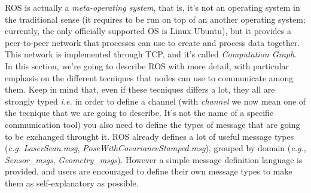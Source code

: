 \ac{ROS} is actually a \textit{meta-operating system}, that is, it's not an operating system in the traditional sense (it requires to be run on top of an another operating system; currently, the only officially supported OS is Linux Ubuntu), but it provides a peer-to-peer network that processes can use to create and process data together. This network is implemented through TCP, and it's called \textit{Computation Graph}. In this section, we're going to describe \ac{ROS} with more detail, with particular emphasis on the different tecniques that nodes can use to communicate among them. Keep in mind that, even if these tecniques differs a lot, they all are strongly typed \textit{i.e.} in order to define a channel (with \textit{channel} we now mean one of the tecnique that we are going to describe. It's not the name of a specific communication tool) you also need to define the types of message that are going to be exchanged throught it. \ac{ROS} already defines a lot of useful message types (\textit{e.g.} \textit{LaserScan.msg}, \textit{PoseWithCovarianceStamped.msg}), grouped by domain (\textit{e.g.}, \textit{Sensor\_msgs}, \textit{Geometry\_msgs}). However a simple message definition language is provided, and users are encouraged to define their own message types to make them as self-explanatory as possible.
